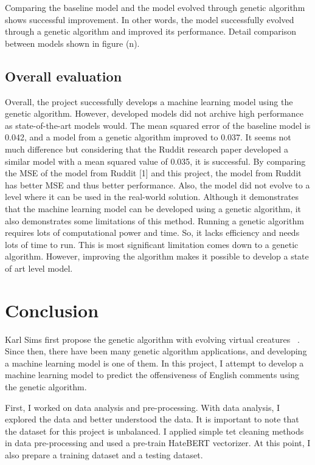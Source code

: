 \documentclass[11pt, natbib=false]{article}
\begin{document}
Comparing the baseline model and the model evolved through genetic algorithm shows successful improvement.
In other words, the model successfully evolved through a genetic algorithm and improved its performance.
Detail comparison between models shown in figure (n).

\subsection{Overall evaluation}
Overall, the project successfully develops a machine learning model using the genetic algorithm.
However, developed models did not archive high performance as state-of-the-art models would.
The mean squared error of the baseline model is 0.042, and a model from a genetic algorithm improved to 0.037.
It seems not much difference but considering that the Ruddit research paper developed a similar model with a mean squared value of 0.035, it is successful.
By comparing the MSE of the model from Ruddit [1] and this project, the model from Ruddit has better MSE and thus better performance.
Also, the model did not evolve to a level where it can be used in the real-world solution.
Although it demonstrates that the machine learning model can be developed using a genetic algorithm, it also demonstrates some limitations of this method.
Running a genetic algorithm requires lots of computational power and time.
So, it lacks efficiency and needs lots of time to run.
This is most significant limitation comes down to a genetic algorithm.
However, improving the algorithm makes it possible to develop a state of art level model.

\section{Conclusion}
Karl Sims first propose the genetic algorithm with evolving virtual creatures ~\cite{sims1994evolving}.
Since then, there have been many genetic algorithm applications, and developing a machine learning model is one of them.
In this project, I attempt to develop a machine learning model to predict the offensiveness of English comments using the genetic algorithm.

First, I worked on data analysis and pre-processing.
With data analysis, I explored the data and better understood the data.
It is important to note that the dataset for this project is unbalanced.
I applied simple tet cleaning methods in data pre-processing and used a pre-train HateBERT vectorizer.
At this point, I also prepare a training dataset and a testing dataset.
\end{document}
